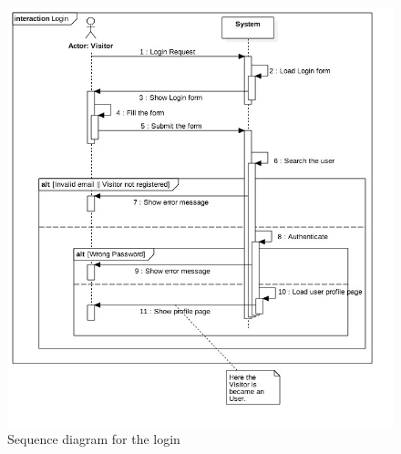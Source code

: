 \clearpage

\begin{figure}
	\centerline{\includegraphics[width=\paperwidth]{./figures/SD_Login.jpg}}
	\caption{Sequence diagram for the login}
\end{figure}

\clearpage

